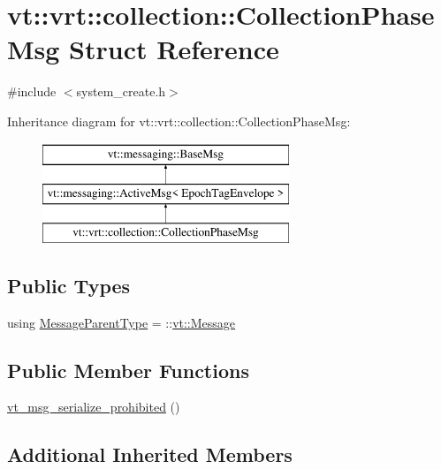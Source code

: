 \hypertarget{structvt_1_1vrt_1_1collection_1_1_collection_phase_msg}{}\section{vt\+:\+:vrt\+:\+:collection\+:\+:Collection\+Phase\+Msg Struct Reference}
\label{structvt_1_1vrt_1_1collection_1_1_collection_phase_msg}


{\ttfamily \#include $<$system\+\_\+create.\+h$>$}

Inheritance diagram for vt\+:\+:vrt\+:\+:collection\+:\+:Collection\+Phase\+Msg\+:\begin{figure}[H]
\begin{center}
\leavevmode
\includegraphics[height=3.000000cm]{structvt_1_1vrt_1_1collection_1_1_collection_phase_msg}
\end{center}
\end{figure}
\subsection*{Public Types}
\begin{DoxyCompactItemize}
\item 
using \hyperlink{structvt_1_1vrt_1_1collection_1_1_collection_phase_msg_ae3c11bee048cf35f11453a798269df6a}{Message\+Parent\+Type} = \+::\hyperlink{namespacevt_a3a3ddfef40b4c90915fa43cdd5f129ea}{vt\+::\+Message}
\end{DoxyCompactItemize}
\subsection*{Public Member Functions}
\begin{DoxyCompactItemize}
\item 
\hyperlink{structvt_1_1vrt_1_1collection_1_1_collection_phase_msg_a34b0d7bb42a203ca9b364761c8d860e6}{vt\+\_\+msg\+\_\+serialize\+\_\+prohibited} ()
\end{DoxyCompactItemize}
\subsection*{Additional Inherited Members}



